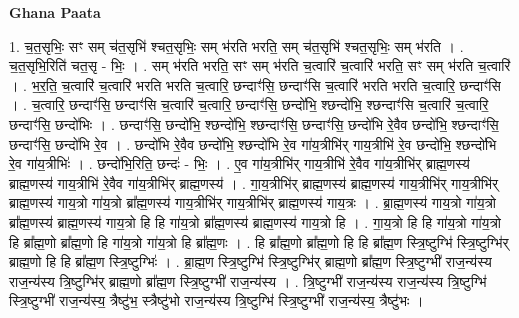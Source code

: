 \documentclass[17pt]{extarticle}
\begin{document}
\textbf{Ghana Paata } \newline

1. च॒त॒सृभिः॒ सꣳ सम् च॑त॒सृभि॑ श्चत॒सृभिः॒ सम् भ॑रति भरति॒ सम् च॑त॒सृभि॑ श्चत॒सृभिः॒ सम् भ॑रति । . च॒त॒सृभि॒रिति॑ चत॒सृ - भिः॒ । . सम् भ॑रति भरति॒ सꣳ सम् भ॑रति च॒त्वारि॑ च॒त्वारि॑ भरति॒ सꣳ सम् भ॑रति च॒त्वारि॑ । . भ॒र॒ति॒ च॒त्वारि॑ च॒त्वारि॑ भरति भरति च॒त्वारि॒ छन्दाꣳ॑सि॒ छन्दाꣳ॑सि च॒त्वारि॑ भरति भरति च॒त्वारि॒ छन्दाꣳ॑सि । . च॒त्वारि॒ छन्दाꣳ॑सि॒ छन्दाꣳ॑सि च॒त्वारि॑ च॒त्वारि॒ छन्दाꣳ॑सि॒ छन्दो॑भि॒ श्छन्दो॑भि॒ श्छन्दाꣳ॑सि च॒त्वारि॑ च॒त्वारि॒ छन्दाꣳ॑सि॒ छन्दो॑भिः । . छन्दाꣳ॑सि॒ छन्दो॑भि॒ श्छन्दो॑भि॒ श्छन्दाꣳ॑सि॒ छन्दाꣳ॑सि॒ छन्दो॑भि रे॒वैव छन्दो॑भि॒ श्छन्दाꣳ॑सि॒ छन्दाꣳ॑सि॒ छन्दो॑भि रे॒व । . छन्दो॑भि रे॒वैव छन्दो॑भि॒ श्छन्दो॑भि रे॒व गा॑य॒त्रीभि॑र् गाय॒त्रीभि॑ रे॒व छन्दो॑भि॒ श्छन्दो॑भि रे॒व गा॑य॒त्रीभिः॑ । . छन्दो॑भि॒रिति॒ छन्दः॑ - भिः॒ । . ए॒व गा॑य॒त्रीभि॑र् गाय॒त्रीभि॑ रे॒वैव गा॑य॒त्रीभि॑र् ब्राह्म॒णस्य॑ ब्राह्म॒णस्य॑ गाय॒त्रीभि॑ रे॒वैव गा॑य॒त्रीभि॑र् ब्राह्म॒णस्य॑ । . गा॒य॒त्रीभि॑र् ब्राह्म॒णस्य॑ ब्राह्म॒णस्य॑ गाय॒त्रीभि॑र् गाय॒त्रीभि॑र् ब्राह्म॒णस्य॑ गाय॒त्रो गा॑य॒त्रो ब्रा᳚ह्म॒णस्य॑ गाय॒त्रीभि॑र् गाय॒त्रीभि॑र् ब्राह्म॒णस्य॑ गाय॒त्रः । . ब्रा॒ह्म॒णस्य॑ गाय॒त्रो गा॑य॒त्रो ब्रा᳚ह्म॒णस्य॑ ब्राह्म॒णस्य॑ गाय॒त्रो हि हि गा॑य॒त्रो ब्रा᳚ह्म॒णस्य॑ ब्राह्म॒णस्य॑ गाय॒त्रो हि । . गा॒य॒त्रो हि हि गा॑य॒त्रो गा॑य॒त्रो हि ब्रा᳚ह्म॒णो ब्रा᳚ह्म॒णो हि गा॑य॒त्रो गा॑य॒त्रो हि ब्रा᳚ह्म॒णः । . हि ब्रा᳚ह्म॒णो ब्रा᳚ह्म॒णो हि हि ब्रा᳚ह्म॒ण स्त्रि॒ष्टुग्भि॑ स्त्रि॒ष्टुग्भि॑र् ब्राह्म॒णो हि हि ब्रा᳚ह्म॒ण स्त्रि॒ष्टुग्भिः॑ । . ब्रा॒ह्म॒ण स्त्रि॒ष्टुग्भि॑ स्त्रि॒ष्टुग्भि॑र् ब्राह्म॒णो ब्रा᳚ह्म॒ण स्त्रि॒ष्टुग्भी॑ राज॒न्य॑स्य राज॒न्य॑स्य त्रि॒ष्टुग्भि॑र् ब्राह्म॒णो ब्रा᳚ह्म॒ण स्त्रि॒ष्टुग्भी॑ राज॒न्य॑स्य । . त्रि॒ष्टुग्भी॑ राज॒न्य॑स्य राज॒न्य॑स्य त्रि॒ष्टुग्भि॑ स्त्रि॒ष्टुग्भी॑ राज॒न्य॑स्य॒ त्रैष्टु॑भ॒ स्त्रैष्टु॑भो राज॒न्य॑स्य त्रि॒ष्टुग्भि॑ स्त्रि॒ष्टुग्भी॑ राज॒न्य॑स्य॒ त्रैष्टु॑भः । \newline
\end{document}
